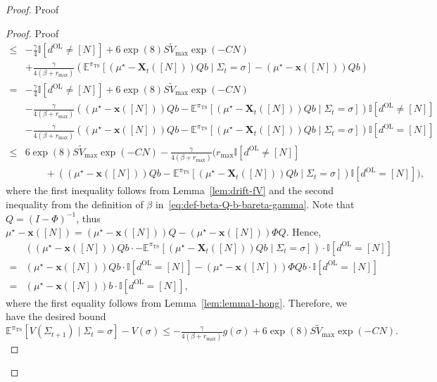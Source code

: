 \documentclass[mnsc,nonblindrev]{informs3}
\newcommand{\E}{\mathbb{E}}
\newcommand{\pits}{\pi_{\mathrm{TS}}}
\newcommand{\bmx}{\bm{x}}
\begin{document}
\begin{APPENDICES}
\begin{proof}{Proof}
\begin{proof}{Proof}
\begin{align*}
        \le & -\frac{\gamma}{4}\mathbb{I}[d^{\mathrm{OL}}\neq [N]]+6\exp(8)S\tilde{V}_{\max}\exp\left(-CN\right) \\
        &+\frac{\gamma}{4(\beta+r_{\max})}\left(\E^{\pits}\left[(\mu^\star-\bm{X}_t([N]))Qb\mid \Sigma_t=\sigma\right]-(\mu^\star-\bmx([N]))Qb\right) \\
        = & -\frac{\gamma}{4}\mathbb{I}[d^{\mathrm{OL}}\neq [N]] 
        +6\exp(8)S\tilde{V}_{\max}\exp\left(-CN\right) \\
        & -\frac{\gamma}{4(\beta+r_{\max})}\left((\mu^\star-\bmx([N]))Qb-\E^{\pits}\left[(\mu^\star-\bm{X}_t([N]))Qb\mid \Sigma_t=\sigma\right]\right)\mathbb{I}[d^{\mathrm{OL}}\neq [N]] \\
        & -\frac{\gamma}{4(\beta+r_{\max})}\left((\mu^\star-\bmx([N]))Qb-\E^{\pits}\left[(\mu^\star-\bm{X}_t([N]))Qb\mid \Sigma_t=\sigma\right]\right)\mathbb{I}[d^{\mathrm{OL}}=[N]] \\
        \le &  6\exp(8)S\tilde{V}_{\max}\exp\left(-CN\right)
        -\frac{\gamma}{4(\beta+r_{\max})}\biggl(r_{\max}\mathbb{I}[d^{\mathrm{OL}}\neq[N]]\\
        &\qquad +\left((\mu^\star-\bmx([N]))Qb  -\E^{\pits}\left[(\mu^\star-\bm{X}_t([N]))Qb\mid \Sigma_t=\sigma\right]\right)\mathbb{I}[d^{\mathrm{OL}}=[N]]\biggr),
    \end{align*}
    where the first inequality follows from Lemma~\ref{lem:drift-fV} and the second inequality from the definition of $\beta$ in~\eqref{eq:def-beta-Q-b-bareta-gamma}.
    Note that $Q=(I-\Phi)^{-1}$, thus
    $
        \mu^\star-\bmx([N])=(\mu^\star-\bmx([N]))Q-(\mu^\star-\bmx([N]))\Phi Q.
    $
    Hence,
    \begin{align*}
        &\left((\mu^\star-\bmx([N]))Qb\cdot-\E^{\pits}[(\mu^\star-\bm{X}_t([N]))Qb\mid \Sigma_t=\sigma]\right)\cdot\mathbb{I}[d^{\mathrm{OL}}= [N]] \\
        =& (\mu^\star-\bmx([N]))Qb\cdot\mathbb{I}[d^{\mathrm{OL}}= [N]]-(\mu^\star-\bmx([N]))\Phi Q b\cdot\mathbb{I}[d^{\mathrm{OL}}= [N]] \\
        =& (\mu^\star-\bmx([N]))b\cdot\mathbb{I}[d^{\mathrm{OL}}= [N]], 
    \end{align*}
    where the first equality follows from Lemma~\ref{lem:lemma1-hong}.
    Therefore, we have the desired bound
    $
         \E^{\pits}[V(\Sigma_{t+1})\mid \Sigma_t=\sigma]-V(\sigma) 
         \le -\frac{\gamma}{4(\beta+r_{\max})}g(\sigma)+6\exp(8)S\tilde{V}_{\max}\exp\left(-CN\right).
    $
\end{proof}

\end{proof}
\end{APPENDICES}
\end{document}
